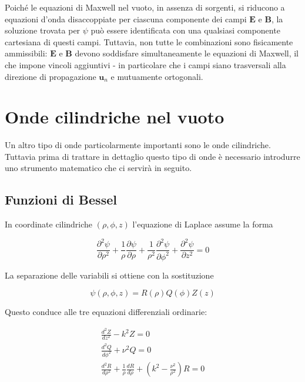 Poiché le equazioni di Maxwell nel vuoto, in assenza di sorgenti, si riducono a equazioni d'onda disaccoppiate per ciascuna componente dei campi $\mathbf{E}$ e $\mathbf{B}$, la soluzione trovata per $\psi$ può essere identificata con una qualsiasi componente cartesiana di questi campi. 
Tuttavia, non tutte le combinazioni sono fisicamente ammissibili: $\mathbf{E}$ e $\mathbf{B}$ devono soddisfare simultaneamente le equazioni di Maxwell, il che impone vincoli aggiuntivi - in particolare che i campi siano trasversali alla direzione di propagazione $\mathbf{u}_n$ e mutuamente ortogonali.

\newpage

\section{Onde cilindriche nel vuoto}

Un altro tipo di onde particolarmente importanti sono le onde cilindriche. \\

Tuttavia prima di trattare in dettaglio questo tipo di onde è necessario introdurre uno strumento matematico che ci servirà in seguito. 

\subsection{Funzioni di Bessel}

In coordinate cilindriche $(\rho, \phi, z)$ l'equazione di Laplace assume la forma 

\begin{equation}
    \frac{\partial^2 \psi}{\partial \rho^2} + \frac{1}{\rho} \frac{\partial \psi}{\partial \rho} + \frac{1}{\rho^2} \frac{\partial^2 \psi}{\partial \phi^2} + \frac{\partial^2 \psi}{\partial z^2} = 0
\end{equation}

La separazione delle variabili si ottiene con la sostituzione 

\begin{equation}
    \psi(\rho, \phi, z) = R(\rho) Q(\phi) Z(z)
\end{equation}

Questo conduce alle tre equazioni differenziali ordinarie:

\begin{align}
    \frac{d^2 Z}{dz^2} - k^2 Z = 0 \\
    \frac{d^2 Q}{d \phi^2} + \nu^2 Q = 0 \\
    \frac{d^2 R}{d \rho^2} + \frac{1}{\rho} \frac{dR}{d\rho} + \left( k^2 - \frac{\nu^2}{\rho^2} \right) R = 0
\end{align}

